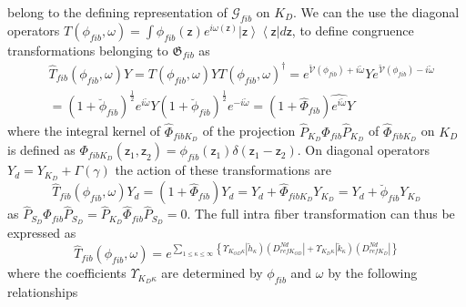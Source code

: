 \documentclass[aps,preprint]{revtex4}%
\begin{document}
belong to the defining representation of $\mathcal{G}_{fib}$ on $K_{D}$. We
can the use the diagonal operators $T\left(  \phi_{fib},\omega\right)
=\int\phi_{fib}\left(  \mathsf{z}\right)  e^{i\omega\left(  \mathsf{z}\right)
}\left|  \mathsf{z}\right\rangle \left\langle \mathsf{z}\right|  d\mathsf{z}$,
to define congruence transformations belonging to $\mathfrak{G}_{fib}$ as
\begin{align}
&  \hat{T}_{fib}\left(  \phi_{fib},\omega\right)  Y=T\left(  \phi_{fib}%
,\omega\right)  YT\left(  \phi_{fib},\omega\right)  ^{\dagger}%
=e^{\mathcal{\breve{V}}\left(  \phi_{fib}\right)  +i\breve{\omega}%
}Ye^{\mathcal{\breve{V}}\left(  \phi_{fib}\right)  -i\breve{\omega}%
}\nonumber\\
&  =\left(  1+\breve{\phi}_{fib}\right)  ^{\frac{1}{2}}e^{i\breve{\omega}%
}Y\left(  1+\breve{\phi}_{fib}\right)  ^{\frac{1}{2}}e^{-i\breve{\omega}%
}=\left(  1+\hat{\Phi}_{fib}\right)  \widehat{e^{i\breve{\omega}}}Y
\end{align}
where the integral kernel of $\hat{\Phi}_{fibK_{D}}$ of the projection
$\hat{P}_{K_{D}}\hat{\Phi}_{fib}\hat{P}_{K_{D}}$ of $\hat{\Phi}_{fibK_{D}}$ on
$K_{D}$ is defined as $\Phi_{fibK_{D}}\left(  \mathsf{z}_{1}\mathsf{,z}%
_{2}\right)  =\phi_{fib}\left(  \mathsf{z}_{1}\right)  \delta\left(
\mathsf{z}_{1}-\mathsf{z}_{2}\right)  $. On diagonal operators $Y_{d}%
=Y_{K_{D}}+\Gamma\left(  \gamma\right)  $ the action of these transformations
are
\begin{equation}
\hat{T}_{fib}\left(  \phi_{fib},\omega\right)  Y_{d}=\left(  1+\hat{\Phi
}_{fib}\right)  Y_{d}=Y_{d}+\hat{\Phi}_{fibK_{D}}Y_{K_{D}}=Y_{d}+\breve{\phi
}_{fib}Y_{K_{D}}%
\end{equation}
as $\hat{P}_{S_{D}}\hat{\Phi}_{fib}\hat{P}_{S_{D}}=\hat{P}_{K_{D}}\hat{\Phi
}_{fib}\hat{P}_{S_{D}}=0$. The full intra fiber transformation can thus be
expressed as
\begin{equation}
\hat{T}_{fib}\left(  \phi_{fib},\omega\right)  =e^{\sum_{1\leq\kappa\leq
\infty}\left\{  \Upsilon_{K_{OD}\kappa}\left|  \breve{h}_{\kappa}\right)
\left(  D_{refK_{OD}}^{Nd}\right|  +\Upsilon_{K_{D}\kappa}\left|  \breve
{k}_{\kappa}\right)  \left(  D_{refK_{D}}^{Nd}\right|  \right\}  }
\label{parker}%
\end{equation}
where the coefficients $\Upsilon_{K_{D}\kappa}$ are determined by $\phi_{fib}$
and $\omega$ by the following relationships%
\end{document}
